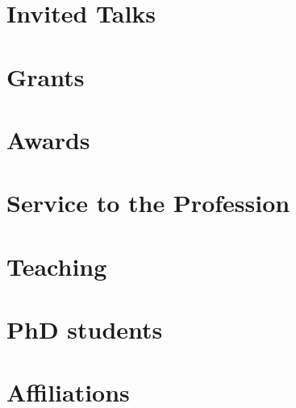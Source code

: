 \documentclass[11pt,a4paper]{article}
\begin{document}
\section*{Invited Talks}%


\section*{Grants}%


\section*{Awards}%


\section*{Service to the Profession}%


\section*{Teaching}%


\section*{PhD students}%


\section*{Affiliations}%

\end{document}
